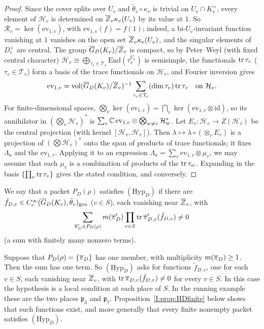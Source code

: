 \begin{proof}
Since the cover splits over $U_v$ and $\tilde\theta_v\circ\kappa_v$ is trivial on $U_v\cap K_v^\times$, every element of $\mathcal H_v$ is determined on $\overline{Z}_v\kappa_v(U_v)$ by its value at $1$. So $\mathcal R_v=\ker(\mathrm{ev}_{1,v})$, with $\mathrm{ev}_{1,v}(f)=f(1)$; indeed, a bi-$U_v$-invariant function vanishing at $1$ vanishes on the open set $\overline{Z}_v\kappa_v(U_v)$, and the singular elements of $D_v^\times$ are central. The group $\overline{G}_D(K_v)/\overline{Z}_v$ is compact, so by Peter--Weyl (with fixed central character) $\mathcal H_v\cong\bigoplus_{\tau_v\in\mathcal T_v}\mathrm{End}(\tau_v^{U_v})$ is semisimple, the functionals $\operatorname{tr}\tau_v$ ($\tau_v\in\mathcal T_v$) form a basis of the trace functionals on $\mathcal H_v$, and Fourier inversion gives
\[ \mathrm{ev}_{1,v}=\operatorname{vol}(\overline{G}_D(K_v)/\overline{Z}_v)^{-1}\sum_{\tau_v\in\mathcal T_v}(\dim\tau_v)\operatorname{tr}\tau_v\quad\text{on }\mathcal H_v. \]
For finite-dimensional spaces, $\bigotimes_v\ker(\mathrm{ev}_{1,v})=\bigcap_v\ker(\mathrm{ev}_{1,v}\otimes\mathrm{id})$, so its annihilator in $(\bigotimes_v\mathcal H_v)^*$ is $\sum_v\mathbb{C}\,\mathrm{ev}_{1,v}\otimes\bigotimes_{w\ne v}\mathcal H_w^*$. Let $E_v:\mathcal H_v\to Z(\mathcal H_v)$ be the central projection (with kernel $[\mathcal H_v,\mathcal H_v]$). Then $\lambda\mapsto\lambda\circ(\otimes_vE_v)$ is a projection of $(\bigotimes\mathcal H_v)^*$ onto the span of products of trace functionals; it fixes $\Lambda_a$ and the $\mathrm{ev}_{1,v}$. Applying it to an expression $\Lambda_a=\sum_v\mathrm{ev}_{1,v}\otimes\mu_v$, we may assume that each $\mu_v$ is a combination of products of the $\operatorname{tr}\tau_w$. Expanding in the basis $\{\prod_v\operatorname{tr}\tau_v\}$ gives the stated condition, and conversely.
\end{proof}

\begin{definition}\label{I:def:HD}
We say that a packet $P_D(\rho)$ satisfies $(\mathrm{Hyp}_D)$ if there are $\tilde f_{D,v}\in C_c^\infty(\overline{G}_D(K_v),\tilde\theta_v)_{\mathrm{gen}}$ ($v\in S$), each vanishing near $\overline{Z}_v$, with
\[ \sum_{\overline{\pi}'_D\in P_D(\rho)}m(\overline{\pi}'_D)\prod_{v\in S}\operatorname{tr}\overline{\pi}'_{D,v}(\tilde f_{D,v})\neq0 \]
(a sum with finitely many nonzero terms).
\end{definition}

\begin{example}\label{I:ex:HD}
Suppose that $P_D(\rho)=\{\overline{\pi}_D\}$ has one member, with multiplicity $m(\overline{\pi}_D)\ge1$. Then the sum has one term. So $(\mathrm{Hyp}_D)$ asks for functions $\tilde f_{D,v}$, one for each $v\in S$, each vanishing near $\overline{Z}_v$, with $\operatorname{tr}\overline{\pi}_{D,v}(\tilde f_{D,v})\neq0$ for every $v\in S$. In this case the hypothesis is a local condition at each place of $S$. In the running example these are the two places $\mathfrak p_3$ and $\mathfrak p_7$. Proposition~\ref{I:prop:HDfinite} below shows that such functions exist, and more generally that every finite nonempty packet satisfies $(\mathrm{Hyp}_D)$.
\end{example}


